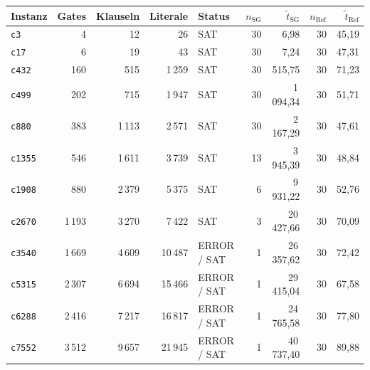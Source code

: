 \begin{tabular}{lrrrlrrrr}
\toprule
Instanz & Gates & Klauseln & Literale & Status & $n_{\mathrm{SG}}$ & $\tilde{t}_{\mathrm{SG}}$ & $n_{\mathrm{Ref}}$ & $\tilde{t}_{\mathrm{Ref}}$ \\
\midrule
\texttt{c3} & 4 & 12 & 26 & SAT & 30 & 6{,}98 & 30 & 45{,}19 \\
\texttt{c17} & 6 & 19 & 43 & SAT & 30 & 7{,}24 & 30 & 47{,}31 \\
\texttt{c432} & 160 & 515 & 1\,259 & SAT & 30 & 515{,}75 & 30 & 71{,}23 \\
\texttt{c499} & 202 & 715 & 1\,947 & SAT & 30 & 1\,094{,}34 & 30 & 51{,}71 \\
\texttt{c880} & 383 & 1\,113 & 2\,571 & SAT & 30 & 2\,167{,}29 & 30 & 47{,}61 \\
\texttt{c1355} & 546 & 1\,611 & 3\,739 & SAT & 13 & 3\,945{,}39 & 30 & 48{,}84 \\
\texttt{c1908} & 880 & 2\,379 & 5\,375 & SAT & 6 & 9\,931{,}22 & 30 & 52{,}76 \\
\texttt{c2670} & 1\,193 & 3\,270 & 7\,422 & SAT & 3 & 20\,427{,}66 & 30 & 70{,}09 \\
\texttt{c3540} & 1\,669 & 4\,609 & 10\,487 & ERROR / SAT & 1 & 26\,357{,}62 & 30 & 72{,}42 \\
\texttt{c5315} & 2\,307 & 6\,694 & 15\,466 & ERROR / SAT & 1 & 29\,415{,}04 & 30 & 67{,}58 \\
\texttt{c6288} & 2\,416 & 7\,217 & 16\,817 & ERROR / SAT & 1 & 24\,765{,}58 & 30 & 77{,}80 \\
\texttt{c7552} & 3\,512 & 9\,657 & 21\,945 & ERROR / SAT & 1 & 40\,737{,}40 & 30 & 89{,}88 \\
\bottomrule
\end{tabular}
